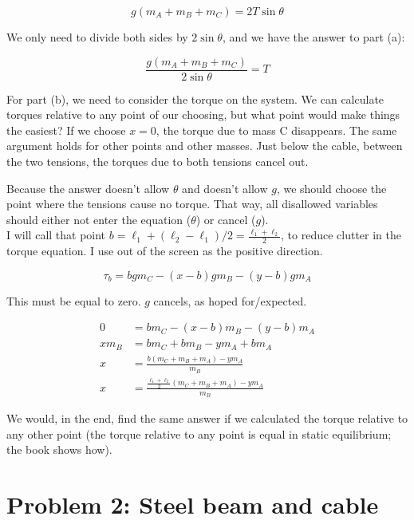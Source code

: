 \documentclass[8.01x]{subfiles}
\begin{document}
\begin{equation}
g(m_A + m_B + m_C) = 2 T \sin \theta
\end{equation}

We only need to divide both sides by $2 \sin \theta$, and we have the answer to part (a):

\begin{equation}
\frac{g(m_A + m_B + m_C)}{2 \sin \theta} = T
\end{equation}

For part (b), we need to consider the torque on the system. We can calculate torques relative to any point of our choosing, but what point would make things the easiest? If we choose $x = 0$, the torque due to mass C disappears. The same argument holds for other points and other masses. Just below the cable, between the two tensions, the torques due to both tensions cancel out.

Because the answer doesn't allow $\theta$ and doesn't allow $g$, we should choose the point where the tensions cause no torque. That way, all disallowed variables should either not enter the equation ($\theta$) or cancel ($g$).\\
I will call that point $\displaystyle b = \ell_1 + (\ell_2 - \ell_1)/2 = \frac{\ell_1 + \ell_2}{2}$, to reduce clutter in the torque equation. I use out of the screen as the positive direction.

\begin{equation}
\tau_b = b g m_C - (x - b) g m_B - (y - b) g m_A
\end{equation}

This must be equal to zero. $g$ cancels, as hoped for/expected.

\begin{align}
0 &= b m_C - (x - b) m_B - (y - b) m_A\\
x m_B &= b m_C + b m_B - y m_A + b m_A\\
x &= \frac{b(m_C + m_B + m_A) - y m_A}{m_B}\\
x &= \frac{\frac{\ell_1 + \ell_2}{2} (m_C + m_B + m_A) - y m_A}{m_B}
\end{align}

We would, in the end, find the same answer if we calculated the torque relative to any other point (the torque relative to any point is equal in static equilibrium; the book shows how).

\section{Problem 2: Steel beam and cable}
\end{document}
